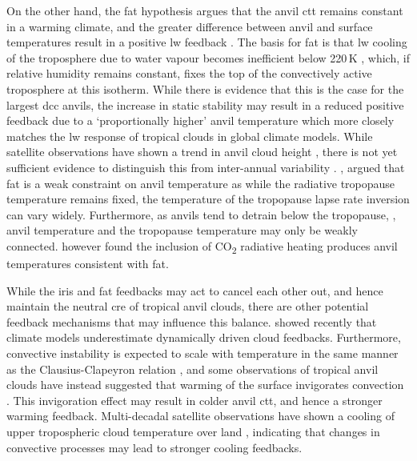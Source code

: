 On the other hand, the \acrfull{fat} hypothesis argues that the anvil \acrfull{ctt} remains constant in a warming climate, and the greater difference between anvil and surface temperatures result in a positive \acrshort{lw} feedback \citep{hartmann_important_2002}.
The basis for \acrfull{fat} is that \acrshort{lw} cooling of the troposphere due to water vapour becomes inefficient below 220\,\unit{K} \citep{jeevanjee_simple_2020}, which, if relative humidity remains constant, fixes the top of the convectively active troposphere at this isotherm. 
While there is evidence that this is the case for the largest \acrshort{dcc} anvils, the increase in static stability may result in a reduced positive feedback due to a `proportionally higher' anvil temperature \citep{zelinka_why_2010} which more closely matches the \acrshort{lw} response of tropical clouds in global climate models.
While satellite observations have shown a trend in anvil cloud height \citep{norris_evidence_2016}, there is not yet sufficient evidence to distinguish this from inter-annual variability \citep{takahashi_when_2019}.
\citet{seeley_fat_2019}, argued that \acrshort{fat} is a weak constraint on anvil temperature as while the radiative tropopause temperature remains fixed, the temperature of the tropopause lapse rate inversion can vary widely. 
Furthermore, as anvils tend to detrain below the tropopause, \citep{takahashi_level_2017, wang_observational_2020}, anvil temperature and the tropopause temperature may only be weakly connected.
\citet{seidel_temperatures_2022} however found the inclusion of CO\textsubscript{2} radiative heating produces anvil temperatures consistent with \acrshort{fat}.

While the iris and \acrshort{fat} feedbacks may act to cancel each other out, and hence maintain the neutral \acrshort{cre} of tropical anvil clouds, there are other potential feedback mechanisms that may influence this balance.
\citet{hill_climate_2023} showed recently that climate models underestimate dynamically driven cloud feedbacks.
Furthermore, convective instability is expected to scale with temperature in the same manner as the Clausius-Clapeyron relation \citep{seeley_why_2015, agard_clausius_2017}, and some observations of tropical anvil clouds have instead suggested that warming of the surface invigorates convection \citep{igel_cloudsat_2014}.
This invigoration effect may result in colder anvil \acrfull{ctt}, and hence a stronger warming feedback.
Multi-decadal satellite observations have shown a cooling of upper tropospheric cloud temperature over land \citep{liu_observed_2023}, indicating that changes in convective processes may lead to stronger cooling feedbacks.

